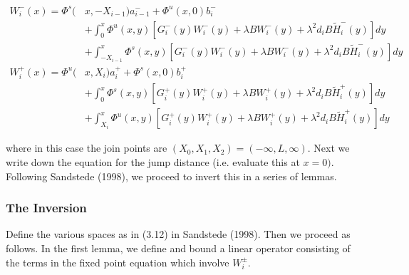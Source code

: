 \documentclass[12pt]{article}
\begin{document}
\begin{align*}
W_i^-(x) = \Phi^s(&x, -X_{i-1})a_{i-1}^- + \Phi^u(x, 0)b_i^- \\
&+ \int_0^x \Phi^u(x, y)[G_i^-(y) W_i^-(y) + \lambda B W_i^-(y) + \lambda^2 d_i B \tilde{H}_i^-(y) ] dy \\
&+ \int_{-X_{i-1}}^x \Phi^s(x, y)[G_i^-(y) W_i^-(y) + \lambda B W_i^-(y) + \lambda^2 d_i B \tilde{H}_i^-(y) ] dy \\
W_i^+(x) = \Phi^u(&x, X_i)a_i^+ + \Phi^s(x, 0)b_i^+ \\
&+ \int_0^x \Phi^s(x, y)[G_i^+(y) W_i^+(y) + \lambda B W_i^+(y) + \lambda^2 d_i B \tilde{H}_i^+(y)] dy \\
&+ \int_{X_i}^x \Phi^u(x, y)[G_i^+(y) W_i^+(y) + \lambda B W_i^+(y) + \lambda^2 d_i B \tilde{H}_i^+(y)]dy
\end{align*}

where in this case the join points are $(X_0, X_1, X_2) = (-\infty, L, \infty)$. Next we write down the equation for the jump distance (i.e. evaluate this at $x = 0)$. \\

Following Sandstede (1998), we proceed to invert this in a series of lemmas. 

\subsubsection*{The Inversion}

Define the various spaces as in (3.12) in Sandstede (1998). Then we proceed as follows. In the first lemma, we define and bound a linear operator consisting of the terms in the fixed point equation which involve $W_i^\pm$.
\end{document}
